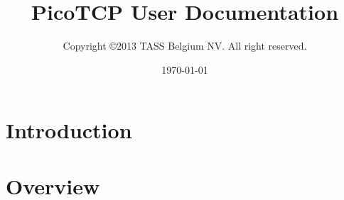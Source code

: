 %






\usepackage{hyperref}
\usepackage{longtable}

\usepackage{draftwatermark}

\usepackage[compact]{titlesec}

\usepackage{enumitem}




\title{PicoTCP User Documentation}
\author{Copyright \copyright 2013 TASS Belgium NV. All right reserved.}
\date{\today}
\maketitle

\thispagestyle{empty}



\tableofcontents

\chapter{Introduction}
\label{chap:intro}
%

\chapter{Overview}
\label{chap:overview}
%


